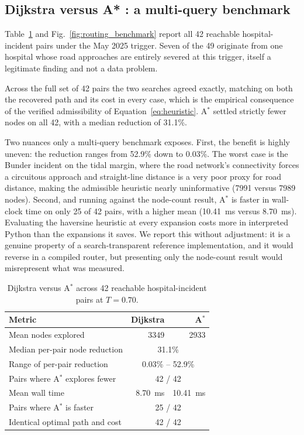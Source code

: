 \documentclass[10pt,twocolumn]{article}
\begin{document}
\subsection{Dijkstra versus A* : a multi-query benchmark}
\label{sec:res-algo}

Table~\ref{tab:algo} and Fig.~\ref{fig:routing_benchmark} report all 42
reachable hospital-incident pairs under the May 2025 trigger. Seven of the 49
originate from one hospital whose road approaches are entirely severed at this
trigger, itself a legitimate finding and not a data problem.

Across the full set of 42 pairs the two searches agreed exactly, matching on both
the recovered path and its cost in every case, which is the empirical consequence
of the verified admissibility of Equation~\eqref{eq:heuristic}. A$^\ast$ settled
strictly fewer nodes on all 42, with a median reduction of 31.1\%.

Two nuances only a multi-query benchmark exposes. First, the benefit is highly
uneven: the reduction ranges from 52.9\% down to 0.03\%. The worst case is the
Bunder incident on the tidal margin, where the road network's connectivity forces
a circuitous approach and straight-line distance is a very poor proxy for road
distance, making the admissible heuristic nearly uninformative (\num{7991} versus
\num{7989} nodes). Second, and running against the node-count result, A$^\ast$ is
faster in wall-clock time on only 25 of 42 pairs, with a higher mean
(\SI{10.41}{\milli\second} versus \SI{8.70}{\milli\second}). Evaluating the
haversine heuristic at every expansion costs more in interpreted Python than the
expansions it saves. We report this without adjustment: it is a genuine property
of a search-transparent reference implementation, and it would reverse in a
compiled router, but presenting only the node-count result would misrepresent
what was measured.

\begin{table}[!t]
\centering\footnotesize
\caption{Dijkstra versus A$^\ast$ across 42 reachable hospital-incident pairs at
$T=0.70$.}
\label{tab:algo}
\small
\begin{tabular}{@{}lrr@{}}
\toprule
\textbf{Metric} & \textbf{Dijkstra} & \textbf{A}$^\ast$ \\
\midrule
Mean nodes explored & \num{3349} & \num{2933} \\
Median per-pair node reduction & \multicolumn{2}{c}{31.1\%} \\
Range of per-pair reduction & \multicolumn{2}{c}{0.03\% -- 52.9\%} \\
Pairs where A$^\ast$ explores fewer & \multicolumn{2}{c}{42 / 42} \\
Mean wall time & \SI{8.70}{\milli\second} & \SI{10.41}{\milli\second} \\
Pairs where A$^\ast$ is faster & \multicolumn{2}{c}{25 / 42} \\
Identical optimal path and cost & \multicolumn{2}{c}{42 / 42} \\
\bottomrule
\end{tabular}
\end{table}
\end{document}
